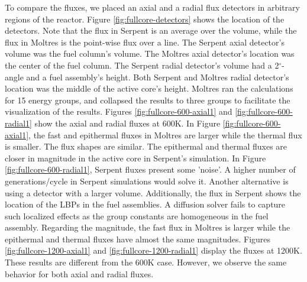 \documentclass[11pt,letterpaper]{article}
\begin{document}
To compare the fluxes, we placed an axial and a radial flux detectors in arbitrary regions of the reactor.
Figure \ref{fig:fullcore-detectors} shows the location of the detectors.
Note that the flux in Serpent is an average over the volume, while the flux in Moltres is the point-wise flux over a line.
The Serpent axial detector's volume was the fuel column's volume.
The Moltres axial detector's location was the center of the fuel column.
The Serpent radial detector's volume had a 2$^{\circ}$-angle and a fuel assembly's height.
Both Serpent and Moltres radial detector's location was the middle of the active core's height.
Moltres ran the calculations for 15 energy groups, and collapsed the results to three groups to facilitate the visualization of the results.
Figures \ref{fig:fullcore-600-axial1} and \ref{fig:fullcore-600-radial1} show the axial and radial fluxes at 600K.
In Figure \ref{fig:fullcore-600-axial1}, the fast and epithermal fluxes in Moltres are larger while the thermal flux is smaller.
The flux shapes are similar.
The epithermal and thermal fluxes are closer in magnitude in the active core in Serpent's simulation.
In Figure \ref{fig:fullcore-600-radial1}, Serpent fluxes present some 'noise'.
A higher number of generations/cycle in Serpent simulations would solve it.
Another alternative is using a detector with a larger volume.
Additionally, the flux in Serpent shows the location of the LBPs in the fuel assemblies.
A diffusion solver fails to capture such localized effects as the group constants are homogeneous in the fuel assembly.
Regarding the magnitude, the fast flux in Moltres is larger while the epithermal and thermal fluxes have almost the same magnitudes.
Figures \ref{fig:fullcore-1200-axial1} and \ref{fig:fullcore-1200-radial1} display the fluxes at 1200K.
These results are different from the 600K case.
However, we observe the same behavior for both axial and radial fluxes.
\end{document}
